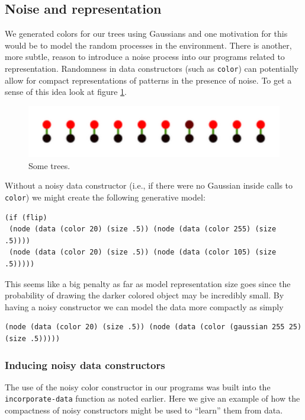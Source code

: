 \documentclass[a4paper,10pt]{article}
\begin{document}
\subsection{Noise and representation}
We generated colors for our trees using Gaussians and one motivation for this would be to model the random processes in the environment.  There is another, more subtle, reason to introduce a noise process into our programs related to representation.  Randomness in data constructors (such as \texttt{color}) can potentially allow for compact representations of patterns in the presence of noise.  To get a sense of this idea look at figure \ref{fig:noiseCons}. 
\begin{figure}[h]
\begin{center}
\includegraphics[scale=.60]{noisyConstructor.pdf}
\end{center}
\caption{Some trees.}
\label{fig:noiseCons}
\end{figure}
Without a noisy data constructor (i.e., if there were no Gaussian inside calls to \texttt{color}) we might create the following generative model:
\begin{lstlisting}
(if (flip)
 (node (data (color 20) (size .5)) (node (data (color 255) (size .5))))
 (node (data (color 20) (size .5)) (node (data (color 105) (size .5)))))
\end{lstlisting}
This seems like a big penalty as far as model representation size goes since the probability of drawing the darker colored object may be incredibly small.  By having a noisy constructor we can model the data more compactly as simply 
\begin{lstlisting}
(node (data (color 20) (size .5)) (node (data (color (gaussian 255 25) (size .5)))))
\end{lstlisting}

\subsubsection{Inducing noisy data constructors}
The use of the noisy color constructor in our programs was built into the \texttt{incorporate-data} function as noted earlier.  Here we give an example of how the compactness of noisy constructors might be used to ``learn'' them from data.
\end{document}
